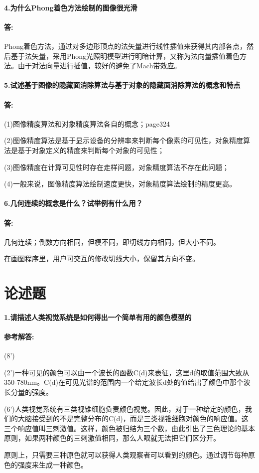 \documentclass[12pt,a4paper,UTF8]{ctexart}
\begin{document}
	\paragraph{4.为什么Phong着色方法绘制的图像很光滑}
	\paragraph{答:}Phong着色方法，通过对多边形顶点的法矢量进行线性插值来获得其内部各点，然后基于法矢量，采用Phong光照明模型进行明暗计算，又称为法向量插值着色方法。由于对法向量进行插值，较好的避免了Mach带效应。
	\paragraph{5.试述基于图像的隐藏面消除算法与基于对象的隐藏面消除算法的概念和特点}
	\paragraph{答:}(1)图像精度算法和对象精度算法各自的概念；page324
	\par (2)图像精度算法是基于显示设备的分辨率来判断每个像素的可见性，对象精度算法是基于对象定义的精度来判断每个对象的可见性；
	\par (3)图像精度在计算可见性时存在走样问题，对象精度算法不存在此问题；
	\par (4)一般来说，图像精度算法绘制速度更快，对象精度算法绘制的精度更高。
	\paragraph{6.几何连续的概念是什么？试举例有什么用？}
	\paragraph{答:}几何连续；倒数方向相同，但模不同，即切线方向相同，但大小不同。
	\par 在画图程序里，用户可交互的修改切线大小，保留其方向不变。

	\section{论述题}
	\paragraph{1.请描述人类视觉系统是如何得出一个简单有用的颜色模型的}
	\paragraph{参考解答:}(8')
	\par (2')一种可见的颜色可以由一个波长的函数C(d)来表征，这里d的取值范围大致从350-780nm。C(d)在可见光谱的范围内一个给定波长d处的值给出了颜色中那个波长分量的强度。
	\par (6')人类视觉系统有三类视锥细胞负责颜色视觉。因此，对于一种给定的颜色，我们的大脑接受到的不是完整分布的C(d)，而是三类视锥细胞对颜色的响应值。这三个响应值叫三刺激值。这样，颜色被归结为三个数，由此引出了三色理论的基本原则，如果两种颜色的三刺激值相同，那么人眼就无法把它们区分开。
	\par 原则上，只需要三种原色就可以获得人类观察者可以看到的颜色。通过调节每种原色的强度来生成一种颜色。
\end{document}
